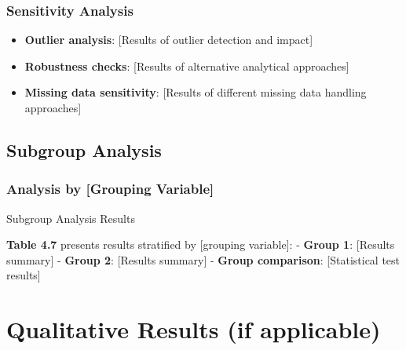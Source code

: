 \documentclass[
  12pt,
  letterpaper,
  12pt,
  letterpaper,
  oneside]{report}
\newenvironment{Shaded}{\begin{snugshade}}{\end{snugshade}}
\newcommand{\CommentTok}[1]{\textcolor[rgb]{0.37,0.37,0.37}{#1}}
\providecommand{\tightlist}{%
  \setlength{\itemsep}{0pt}\setlength{\parskip}{0pt}}
\begin{document}
\subsubsection{Sensitivity Analysis}\label{sensitivity-analysis}

\begin{itemize}
\tightlist
\item
  \textbf{Outlier analysis}: {[}Results of outlier detection and
  impact{]}
\item
  \textbf{Robustness checks}: {[}Results of alternative analytical
  approaches{]}
\item
  \textbf{Missing data sensitivity}: {[}Results of different missing
  data handling approaches{]}
\end{itemize}

\subsection{Subgroup Analysis}\label{subgroup-analysis}

\subsubsection{Analysis by {[}Grouping
Variable{]}}\label{analysis-by-grouping-variable}

\begin{table}

\caption{\label{tbl-subgroup}Subgroup Analysis Results}

\centering{

\begin{Shaded}
\begin{Highlighting}[]
\CommentTok{\# Subgroup analysis table will be generated here}
\end{Highlighting}
\end{Shaded}

}

\end{table}%

\textbf{Table 4.7} presents results stratified by {[}grouping
variable{]}: - \textbf{Group 1}: {[}Results summary{]} - \textbf{Group
2}: {[}Results summary{]} - \textbf{Group comparison}: {[}Statistical
test results{]}

\section{Qualitative Results (if
applicable)}\label{qualitative-results-if-applicable}
\end{document}
